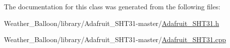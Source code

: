 The documentation for this class was generated from the following files\+:\begin{DoxyCompactItemize}
\item 
Weather\+\_\+\+Balloon/library/\+Adafruit\+\_\+\+S\+H\+T31-\/master/\hyperlink{_adafruit___s_h_t31_8h}{Adafruit\+\_\+\+S\+H\+T31.\+h}\item 
Weather\+\_\+\+Balloon/library/\+Adafruit\+\_\+\+S\+H\+T31-\/master/\hyperlink{_adafruit___s_h_t31_8cpp}{Adafruit\+\_\+\+S\+H\+T31.\+cpp}\end{DoxyCompactItemize}

